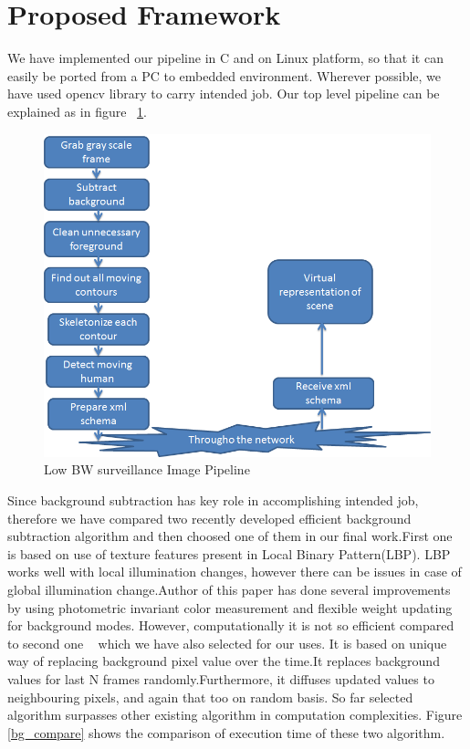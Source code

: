 \documentclass[conference]{IEEEtran}
\begin{document}
\section{Proposed Framework}
We have implemented our pipeline in C and on Linux platform, so that it
can easily be ported from a PC to embedded environment. Wherever
possible, we have used opencv library to carry intended job. Our top
level pipeline can be explained as in figure ~\ref{image_pipeline}.
\begin{figure}[!h]
\centering
\includegraphics[scale=0.35]{figures/image_pipeline}
\caption{Low BW surveillance Image Pipeline}
\label{image_pipeline}
\end{figure}


Since background subtraction has key role in accomplishing intended job,
therefore we have compared two recently developed efficient background
subtraction algorithm and then choosed one of them in our final
work.First one ~\cite{3} is based on use of texture features present in
Local Binary Pattern(LBP). LBP works well with local illumination
changes, however there can be issues in case of global illumination
change.Author of this paper has done several improvements by using
photometric invariant color measurement and flexible weight updating for
background modes. However, computationally it is not so efficient
compared to second one ~\cite{5} which we have also selected for our
uses.  It is based on unique way of replacing background pixel value
over the time.It replaces background values for last N frames
randomly.Furthermore, it diffuses updated values to neighbouring pixels,
and again that too on random basis. So far selected algorithm surpasses
other existing algorithm in computation complexities. Figure
\ref{bg_compare} shows the comparison of execution time of these two
algorithm.
\end{document}
